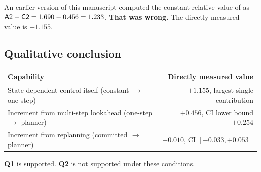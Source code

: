 An earlier version of this manuscript computed the constant-relative value of
 as $\textsf{A2} - \textsf{C2} = 1.690 - 0.456 = 1.233$. \textbf{That was
wrong.} The directly measured value is $+1.155$.

\subsection{Qualitative conclusion}

\begin{center}
\begin{tabular}{lr}
\toprule
Capability & Directly measured value \\
\midrule
State-dependent control itself (constant $\rightarrow$ one-step)
  & $+1.155$, largest single contribution \\
Increment from multi-step lookahead (one-step $\rightarrow$ planner)
  & $+0.456$, CI lower bound $+0.254$ \\
Increment from replanning (committed $\rightarrow$ planner)
  & $+0.010$, CI $[-0.033, +0.053]$ \\
\bottomrule
\end{tabular}
\end{center}

\textbf{Q1} is supported. \textbf{Q2} is not supported under these conditions.
